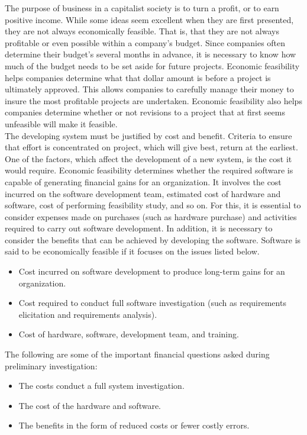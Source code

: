 The purpose of business in a capitalist society is to turn a profit, or to earn positive income. While some ideas seem excellent when they are first presented, they are not always economically feasible. That is, that they are not always profitable or even possible within a company's budget. Since companies often determine their budget's several months in advance, it is necessary to know how much of the budget needs to be set aside for future projects. Economic feasibility helps companies determine what that dollar amount is before a project is ultimately approved. This allows companies to carefully manage their money to insure the most profitable projects are undertaken. Economic feasibility also helps companies determine whether or not revisions to a project that at first seems unfeasible will make it feasible.\\

The developing system must be justified by cost and benefit. Criteria to ensure that effort is concentrated on project, which will give best, return at the earliest. One of the factors, which affect the development of a new system, is the cost it would require. Economic feasibility determines whether the required software is capable of generating financial gains for an organization. It involves the cost incurred on the software development team, estimated cost of hardware and software, cost of performing feasibility study, and so on. For this, it is essential to consider expenses made on purchases (such as hardware purchase) and activities required to carry out software development. In addition, it is necessary to consider the benefits that can be achieved by developing the software. Software is said to be economically feasible if it focuses on the issues listed below.
\begin{itemize}
	\item Cost incurred on software development to produce long-term gains for an organization.
	\item Cost required to conduct full software investigation (such as requirements elicitation and requirements analysis).
	\item Cost of hardware, software, development team, and training.
\end{itemize}

The following are some of the important financial questions asked during preliminary investigation:
\begin{itemize}
	\item The costs conduct a full system investigation.
	\item The cost of the hardware and software.
	\item The benefits in the form of reduced costs or fewer costly errors.
\end{itemize}

